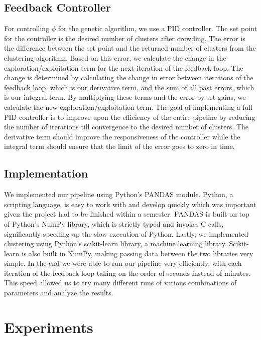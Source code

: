 \documentclass{sig-alternate}
\begin{document}
\subsection{Feedback Controller}
For controlling $\phi$ for the genetic algorithm, we use a PID controller. The set point for the controller is the desired number of clusters after crowding. The error is the difference between the set point and the returned number of clusters from the clustering algorithm. Based on this error, we calculate the change in the exploration/exploitation term for the next iteration of the feedback loop. The change is determined by calculating the change in error between iterations of the feedback loop, which is our derivative term, and the sum of all past errors, which is our integral term. By multiplying these terms and the error by set gains, we calculate the new exploration/exploitation term. The goal of implementing a full PID controller is to improve upon the efficiency of the entire pipeline by reducing the number of iterations till convergence to the desired number of clusters. The derivative term should improve the responsiveness of the controller while the integral term should ensure that the limit of the error goes to zero in time.

\subsection{Implementation}
We implemented our pipeline using Python's PANDAS module. Python, a scripting language, is easy to work with and develop quickly which was important given the project had to be finished within a semester. PANDAS is built on top of Python's NumPy library, which is strictly typed and invokes C calls, significantly speeding up the slow execution of Python. Lastly, we implemented clustering using Python's scikit-learn library, a machine learning library. Scikit-learn is also built in NumPy, making passing data between the two libraries very simple. In the end we were able to run our pipeline very efficiently, with each iteration of the feedback loop taking on the order of seconds instead of minutes. This speed allowed us to try many different runs of various combinations of parameters and analyze the results.

\section{Experiments}
\end{document}
